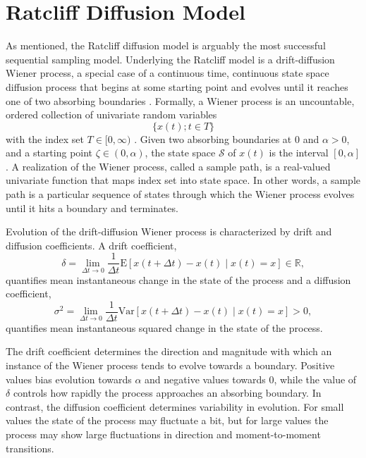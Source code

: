 \documentclass[12pt]{report}
\begin{document}
\section{Ratcliff Diffusion Model}   

As mentioned, the Ratcliff diffusion model is arguably the most successful sequential sampling model. Underlying the Ratcliff model is a drift-diffusion Wiener process, a special case of a continuous time, continuous state space
diffusion process that begins at some starting point and evolves until it reaches one of two absorbing boundaries \citep{Ros2014,KarTay1975,KarTay1981}. Formally, a Wiener process is an
uncountable, ordered collection of univariate random variables 
%
\begin{equation} 
\{x(t); t \in T\} 
\end{equation} 
% 
with the index set $T \in [0, \infty)$ \citep{KarTay1981,Smi2000}. Given two absorbing boundaries at $0$ and $\alpha>0$, and a starting point
$\zeta \in (0, \alpha)$, the state space $\mathcal{S}$ of $x(t)$ is the
interval $[0, \alpha]$. A realization of the Wiener process, called a sample path, is a real-valued univariate function that maps index set into state space. In other words, a sample path is a particular sequence of states through which the Wiener process evolves until it hits a boundary and terminates.

Evolution of the drift-diffusion Wiener process is characterized by drift and diffusion coefficients. A drift coefficient, 
\begin{equation}
\delta = \lim_{\Delta t \to 0}\frac{1}{\Delta t}\mathrm{E}\left[x(t + \Delta t) - x(t) \mid x(t) = x\right] \in \mathbb{R}, 
\end{equation}
quantifies mean instantaneous change in the state of the process and a diffusion coefficient, 
\begin{equation}
\sigma^2 = \lim_{\Delta t \to 0}\frac{1}{\Delta t}\mathrm{Var}\left[x(t + \Delta t) - x(t) \mid x(t) = x\right] > 0,
\end{equation}
quantifies mean instantaneous squared change in the state of the process. 

The drift coefficient determines the direction and magnitude with which an instance of the Wiener process tends to evolve towards a boundary. Positive values bias evolution towards $\alpha$ and negative values towards 0, while the value of $\delta$ controls how rapidly the process approaches an absorbing boundary. In contrast, the diffusion coefficient determines variability in evolution. For small values the state of the process may fluctuate a bit, but for large values the process may show large fluctuations in direction and moment-to-moment transitions.
 
\end{document}

